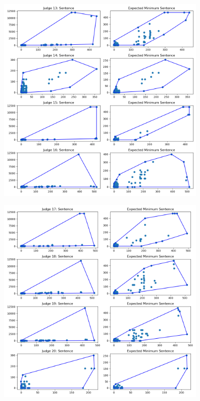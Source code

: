 \documentclass[11pt, oneside]{article}   	%
\theoremstyle{ModifiedStyle}
\begin{document}
			\begin{figure}[H]
				\centering
				\includegraphics[width=0.9\textwidth]{../../output/figures/Exploration/judge_convex_hulls_3.png}
			\end{figure}

			\begin{figure}[H]
				\centering
				\includegraphics[width=0.9\textwidth]{../../output/figures/Exploration/judge_convex_hulls_4.png}
			\end{figure}
\end{document}
